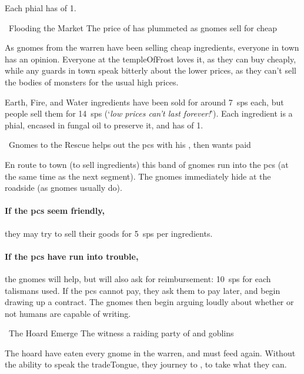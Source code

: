 Each phial has  of 1.

{\squash~Flooding the Market}%
{The price of  has plummeted as gnomes sell for cheap}%

\begin{exampletext}
  As gnomes from the \gls{warren} have been selling cheap \glspl{ingredient}, everyone in town has an opinion.
  Everyone at the \gls{templeOfFrost} loves it, as they can buy cheaply, while any \glspl{guard} in town speak bitterly about the lower prices, as they can't sell the bodies of \glspl{monster} for the usual high prices.
\end{exampletext}

Earth, Fire, and Water \glspl{ingredient} have been sold for around 7~\glspl{sp} each, but people sell them for 14~\glspl{sp} (`\textit{low prices can't last forever!}').
Each \gls{ingredient} is a phial, encased in fungal oil to preserve it, and has  of 1.

{\squash~Gnomes to the Rescue}%
{ helps out the \glspl{pc} with his , then wants paid}%

En route to town (to sell \glspl{ingredient}) this band of gnomes run into the \glspl{pc} (at the same time as the next \gls{segment}).
The gnomes immediately hide at the roadside (as gnomes usually do).

\paragraph{If the \glspl{pc} seem friendly,}
they may try to sell their goods for 5~\glspl{sp} per \glspl{ingredient}.

\paragraph{If the \glspl{pc} have run into trouble,}
the gnomes will help, but will also ask for reimbursement: 10~\glspl{sp} for each \glspl{talisman} used.
If the \glspl{pc} cannot pay, they ask them to pay later, and begin drawing up a contract.
The gnomes then begin arguing loudly about whether or not humans are capable of writing.

{~The Hoard Emerge}%
{The  witness a raiding party of  and goblins}%

\begin{exampletext}
  The hoard have eaten every gnome in the \gls{warren}, and must feed again.
  Without the ability to speak the \gls{tradeTongue}, they journey to , to take what they can.
\end{exampletext}

